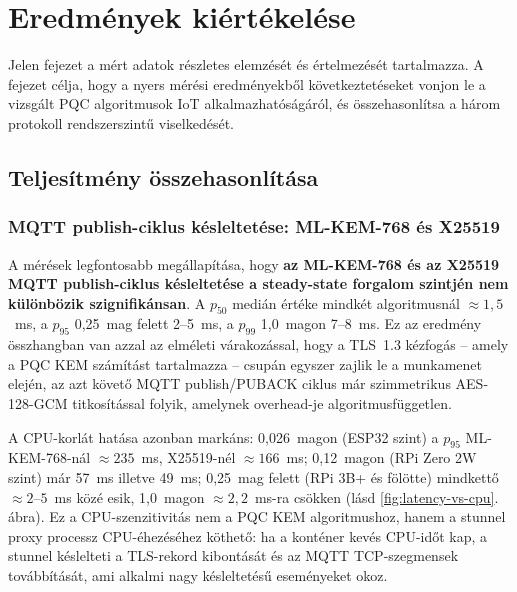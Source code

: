 \chapter{Eredmények kiértékelése}

Jelen fejezet a mért adatok részletes elemzését és értelmezését tartalmazza. A fejezet célja,
hogy a nyers mérési eredményekből következtetéseket vonjon le a vizsgált PQC algoritmusok
IoT alkalmazhatóságáról, és összehasonlítsa a három protokoll rendszerszintű viselkedését.

\section{Teljesítmény összehasonlítása}

\subsection{MQTT publish-ciklus késleltetése: ML-KEM-768 és X25519}

A mérések legfontosabb megállapítása, hogy \textbf{az ML-KEM-768 és az X25519 MQTT
publish-ciklus késleltetése a steady-state forgalom szintjén nem különbözik szignifikánsan}.
A $p_{50}$ medián értéke mindkét algoritmusnál $\approx 1{,}5$~ms, a $p_{95}$
0,25~mag felett 2--5~ms, a $p_{99}$ 1,0~magon 7--8~ms. Ez az eredmény összhangban van
azzal az elméleti várakozással, hogy a TLS~1.3 kézfogás -- amely a PQC KEM számítást
tartalmazza -- csupán egyszer zajlik le a munkamenet elején, az azt követő MQTT
publish/PUBACK ciklus már szimmetrikus AES-128-GCM titkosítással folyik, amelynek
overhead-je algoritmusfüggetlen.

A CPU-korlát hatása azonban markáns: 0,026~magon (ESP32 szint) a $p_{95}$ ML-KEM-768-nál
$\approx 235$~ms, X25519-nél $\approx 166$~ms; 0,12~magon (RPi Zero 2W szint) már 57~ms
illetve 49~ms; 0,25~mag felett (RPi 3B+ és fölötte) mindkettő $\approx 2$--$5$~ms közé
esik, 1,0~magon $\approx 2{,}2$~ms-ra csökken (lásd \ref{fig:latency-vs-cpu}. ábra). Ez a CPU-szenzitivitás nem a PQC KEM
algoritmushoz, hanem a stunnel proxy processz CPU-éhezéséhez köthető: ha a konténer kevés
CPU-időt kap, a stunnel késlelteti a TLS-rekord kibontását és az MQTT TCP-szegmensek
továbbítását, ami alkalmi nagy késleltetésű eseményeket okoz.

